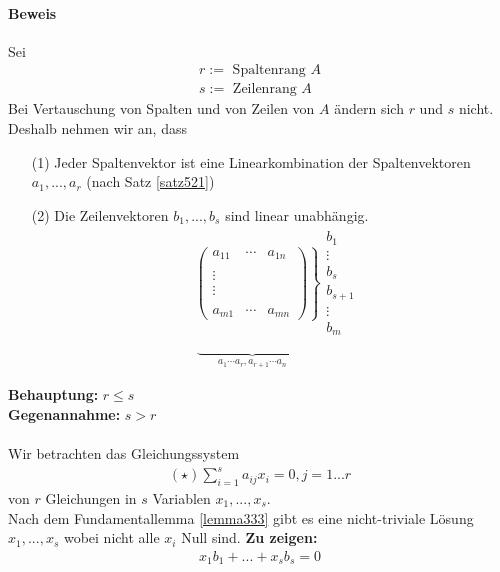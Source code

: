 \documentclass[11pt]{report}
\newcommand*\f[1] {\textbf{#1}}
\begin{document}
\paragraph{Beweis}
Sei
\begin{align}
 r := \text{ Spaltenrang } A \\
 s := \text{ Zeilenrang } A 
\end{align}
Bei Vertauschung von Spalten und von Zeilen von $A$ ändern sich $r$ und $s$ nicht.\\
Deshalb nehmen wir an, dass
\begin{itemize}
 \item[(1)] Jeder Spaltenvektor ist eine Linearkombination der Spaltenvektoren $a_1, ..., a_r$ (nach Satz \ref{satz521})
 \item[(2)] Die Zeilenvektoren $b_1, ..., b_s$ sind linear unabhängig.
\begin{align}
& 
\left. \begin{pmatrix} a_{11} & \cdots & a_{1n} \\ \\ \vdots \\ \vdots \\ \\ a_{m1} & \cdots & a_{mn}\end{pmatrix} \right\}  \begin{matrix} b_1 \\ \vdots \\ b_s \\ b_{s+1} \\ \vdots \\ b_m \end{matrix}\\[-5pt]
& \,\underbrace{\phantom{mmmmmmmmm}}_{a_1 \cdots a_r, a_{r+1} \cdots a_n}
\end{align}
\end{itemize}
\f{Behauptung:} $r \leq s$ \\
\f{Gegenannahme:} $s > r$ \\\\
Wir betrachten das Gleichungssystem 
\begin{align}
(\star) \sum_{i=1}^{s} a_{ij} x_i = 0, j=1...r
\end{align}
von $r$ Gleichungen in $s$ Variablen $x_1, ..., x_s$.\\
Nach dem Fundamentallemma \ref{lemma333} gibt es eine nicht-triviale Lösung $x_1,..., x_s$ wobei nicht alle $x_i$ Null sind.
\f{Zu zeigen:} 
\begin{align}
x_1 b_1 + ... + x_s b_s = 0 
\end{align}
\end{document}
